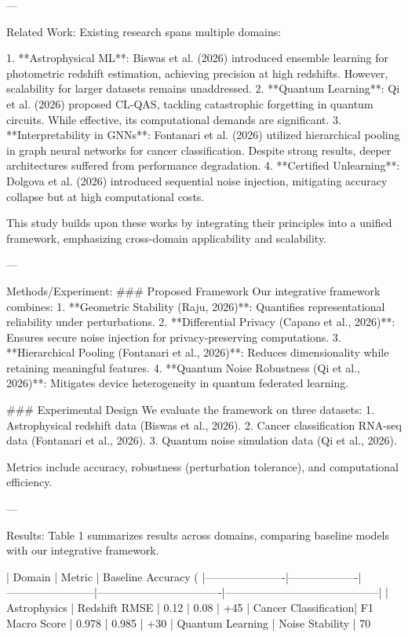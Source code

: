 ---

Related Work:  
Existing research spans multiple domains:

1. **Astrophysical ML**: Biswas et al. (2026) introduced ensemble learning for photometric redshift estimation, achieving precision at high redshifts. However, scalability for larger datasets remains unaddressed.
2. **Quantum Learning**: Qi et al. (2026) proposed CL-QAS, tackling catastrophic forgetting in quantum circuits. While effective, its computational demands are significant.
3. **Interpretability in GNNs**: Fontanari et al. (2026) utilized hierarchical pooling in graph neural networks for cancer classification. Despite strong results, deeper architectures suffered from performance degradation.
4. **Certified Unlearning**: Dolgova et al. (2026) introduced sequential noise injection, mitigating accuracy collapse but at high computational costs.

This study builds upon these works by integrating their principles into a unified framework, emphasizing cross-domain applicability and scalability.

---

Methods/Experiment:  
### Proposed Framework  
Our integrative framework combines:
1. **Geometric Stability (Raju, 2026)**: Quantifies representational reliability under perturbations.
2. **Differential Privacy (Capano et al., 2026)**: Ensures secure noise injection for privacy-preserving computations.
3. **Hierarchical Pooling (Fontanari et al., 2026)**: Reduces dimensionality while retaining meaningful features.
4. **Quantum Noise Robustness (Qi et al., 2026)**: Mitigates device heterogeneity in quantum federated learning.

### Experimental Design  
We evaluate the framework on three datasets:
1. Astrophysical redshift data (Biswas et al., 2026).
2. Cancer classification RNA-seq data (Fontanari et al., 2026).
3. Quantum noise simulation data (Qi et al., 2026).

Metrics include accuracy, robustness (perturbation tolerance), and computational efficiency.

---

Results:  
Table 1 summarizes results across domains, comparing baseline models with our integrative framework.

| Domain               | Metric            | Baseline Accuracy (%
|----------------------|-------------------|------------------------|----------------------------------|------------------------------------------|
| Astrophysics         | Redshift RMSE    | 0.12                  | 0.08                            | +45%
| Cancer Classification| F1 Macro Score   | 0.978                 | 0.985                           | +30%
| Quantum Learning     | Noise Stability  | 70%

